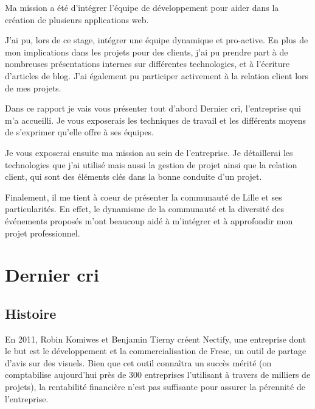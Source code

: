 \documentclass[12pt,a4paper]{article}
\begin{document}
  \bigskip

  Ma mission a été d'intégrer l'équipe de développement pour aider dans la
  création de plusieurs applications web.

  \bigskip

  J'ai pu, lors de ce stage, intégrer une équipe dynamique et pro-active.
  En plus de mon implications dans les projets pour des clients, j'ai pu
  prendre part à de nombreuses présentations internes sur différentes
  technologies, et à l'écriture d'articles de blog. J'ai également pu
  participer activement à la relation client lors de mes projets.

  \bigskip

  Dans ce rapport je vais vous présenter tout d'abord Dernier cri,
  l'entreprise qui m'a accueilli. Je vous exposerais les techniques de
  travail et les différents moyens de s'exprimer qu'elle offre à ses
  équipes.

  \bigskip

  Je vous exposerai ensuite ma mission au sein de l'entreprise. Je
  détaillerai les technologies que j'ai utilisé mais aussi la gestion de
  projet ainsi que la relation client, qui sont des éléments clés dans la
  bonne conduite d'un projet.

  \bigskip

  Finalement, il me tient à coeur de présenter la communauté de Lille et
  ses particularités. En effet, le dynamisme de la communauté et la
  diversité des événements proposés m'ont beaucoup aidé à m'intégrer et à
  approfondir mon projet professionnel.

  \newpage

  \section{Dernier cri}\label{dernier-cri}

  \bigskip

  \subsection{Histoire}\label{histoire}

  \bigskip

  En 2011, Robin Komiwes et Benjamin Tierny créent Nectify, une entreprise
  dont le but est le développement et la commercialisation de Fresc, un
  outil de partage d'avis sur des visuels. Bien que cet outil connaîtra un
  succès mérité (on comptabilise aujourd'hui près de 300 entreprises
  l'utilisant à travers de milliers de projets), la rentabilité financière
  n'est pas suffisante pour assurer la pérennité de l'entreprise.
\end{document}
